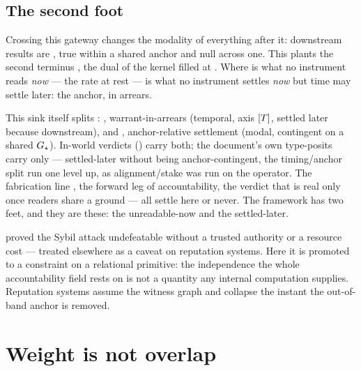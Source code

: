 \documentclass[../main]{subfiles}
\begin{document}
\subsection{The second foot}
\label{subsec:anchor:second-foot}
%
Crossing this gateway changes the modality of everything after it: downstream results are
, true within a shared anchor and null across one. This plants the second
terminus , the dual of the kernel filled at . Where 
is what no instrument reads \emph{now} --- the rate at rest ---  is what no
instrument settles \emph{now} but time may settle later: the anchor, in arrears.

This sink itself splits : , warrant-in-arrears (temporal,
axis $[T]$, settled later because downstream), and , anchor-relative
settlement (modal, contingent on a shared $G\sb{\star}$). In-world verdicts ()
carry both; the document's own type-posits carry only  --- settled-later without
being anchor-contingent, the timing/anchor split run one level up, as alignment/stake was run
on the operator. The fabrication line , the forward leg of accountability, the
verdict that is real only once readers share a ground --- all settle here or never. The
framework has two feet, and they are these: the unreadable-now and the settled-later.

\begin{econ}[label=e:sybil, title={The Sybil attack, promoted to a constraint},
  ref=J:anchor, cites={a:sybil}, departs=caveat,
  stopsat={a side-caveat on reputation systems elsewhere; here a constraint on a relational primitive}]
  \textcite{a:sybil} proved the Sybil attack undefeatable without a trusted authority or a
  resource cost --- treated elsewhere as a caveat on reputation systems. Here it is promoted
  to a constraint on a relational primitive: the independence the whole accountability field
  rests on is not a quantity any internal computation supplies. Reputation systems assume the
  witness graph and collapse the instant the out-of-band anchor is removed.
\end{econ}


\section{Weight is not overlap}
\label{sec:hip}
\end{document}

